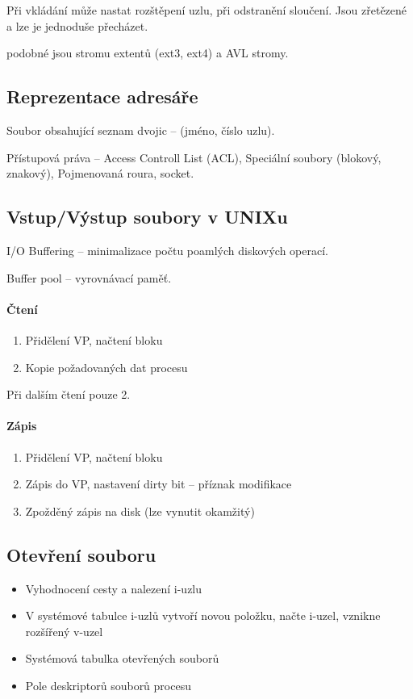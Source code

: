 \documentclass[a4wide]{report}
\begin{document}
Při vkládání může nastat rozštěpení uzlu, při odstranění sloučení. Jsou zřetězené a lze je jednoduše přecházet.

podobné jsou stromu extentů (ext3, ext4) a AVL stromy.

\subsection{Reprezentace adresáře}

Soubor obsahující seznam dvojic --  (jméno, číslo uzlu).

Přístupová práva -- Access Controll List (ACL), Speciální soubory (blokový, znakový), Pojmenovaná roura, socket.

\subsection{Vstup/Výstup soubory v UNIXu}

I/O Buffering -- minimalizace počtu poamlých diskových operací.

Buffer pool -- vyrovnávací paměť.

\paragraph{Čtení}
\begin{enumerate}
	\item Přidělení VP, načtení bloku
	\item Kopie požadovaných dat procesu
\end{enumerate}
Při dalším čtení pouze 2.

\paragraph{Zápis}
\begin{enumerate}
	\item Přidělení VP, načtení bloku
	\item Zápis do VP, nastavení dirty bit -- příznak modifikace
	\item Zpožděný zápis na disk (lze vynutit okamžitý)
\end{enumerate}

\subsection{Otevření souboru}

\begin{itemize}
	\item Vyhodnocení cesty a nalezení i-uzlu
	\item V systémové tabulce i-uzlů vytvoří novou položku, načte i-uzel, vznikne rozšířený v-uzel
	\item Systémová tabulka otevřených souborů
	\item Pole deskriptorů souborů procesu
\end{itemize}
\end{document}

